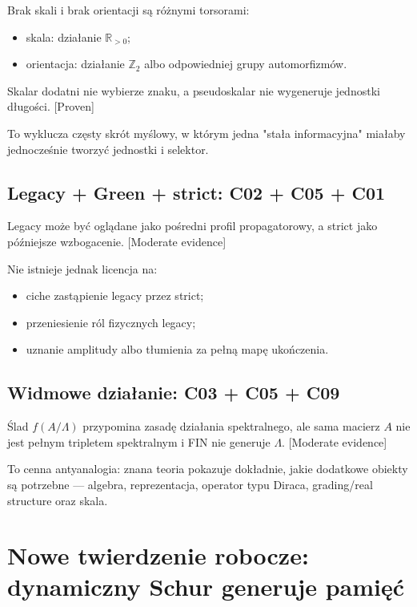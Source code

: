 \documentclass[11pt,a4paper,openany]{report}
\newcommand{\statusProven}{\textcolor{fingreen}{[Proven]}}
\newcommand{\statusModerate}{\textcolor{finviolet}{[Moderate evidence]}}
\begin{document}
Brak skali i brak orientacji są ró\.znymi torsorami:

\begin{itemize}
\item 
skala: działanie \(\mathbb R_{>0}\);

\item 
orientacja: działanie \(\mathbb Z_2\) albo odpowiedniej grupy automorfizmów.

\end{itemize}

Skalar dodatni nie wybierze znaku, a pseudoskalar nie wygeneruje jednostki długości. \statusProven{}

To wyklucza częsty skrót myślowy, w którym jedna "stała informacyjna" miałaby jednocześnie tworzyć jednostki i selektor.

\section{Legacy + Green + strict: C02 + C05 + C01}

Legacy mo\.ze być oglądane jako pośredni profil propagatorowy, a strict jako późniejsze wzbogacenie. \statusModerate{}

Nie istnieje jednak licencja na:

\begin{itemize}
\item 
ciche zastąpienie legacy przez strict;

\item 
przeniesienie ról fizycznych legacy;

\item 
uznanie amplitudy albo tłumienia za pełną mapę ukończenia.

\end{itemize}

\section{Widmowe działanie: C03 + C05 + C09}

Ślad \(f(A/\Lambda)\) przypomina zasadę działania spektralnego, ale sama macierz \(A\) nie jest pełnym tripletem spektralnym i FIN nie generuje \(\Lambda\). \statusModerate{}

To cenna antyanalogia: znana teoria pokazuje dokładnie, jakie dodatkowe obiekty są potrzebne --- algebra, reprezentacja, operator typu Diraca, grading/\allowbreak{}real structure oraz skala.

\chapter{Nowe twierdzenie robocze: dynamiczny Schur generuje pamięć}
\end{document}
